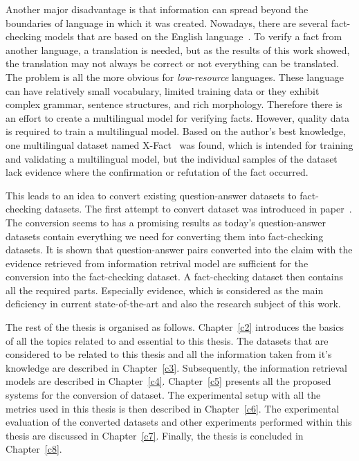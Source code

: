 Another major disadvantage is that information can spread beyond the boundaries of language in which it was created. Nowadays, there are several fact-checking models that are based on the English language~\cite{faviq}\cite{fever}\cite{covert}. To verify a fact from another language, a translation is needed, but as the results of this work showed, the translation may not always be correct or not everything can be translated. The problem is all the more obvious for \emph{low-resource} languages. These language can have relatively small vocabulary, limited training data or they exhibit complex grammar, sentence structures, and rich morphology. Therefore there is an effort to create a multilingual model for verifying facts. However, quality data is required to train a multilingual model. Based on the author's best knowledge, one multilingual dataset named X-Fact~\cite{x-fact} was found, which is intended for training and validating a multilingual model, but the individual samples of the dataset lack evidence where the confirmation or refutation of the fact occurred.

This leads to an idea to convert existing question-answer datasets to fact-checking datasets. The first attempt to convert dataset was introduced in paper~\cite{faviq}. The conversion seems to has a promising results as today's question-answer datasets contain everything we need for converting them into fact-checking datasets. It is shown that question-answer pairs converted into the claim with the evidence retrieved from information retrival model are sufficient for the conversion into the fact-checking dataset. A fact-checking dataset then contains all the required parts. Especially evidence, which is considered as the main deficiency in current state-of-the-art and also the research subject of this work.

The rest of the thesis is organised as follows. Chapter~\ref{c2} introduces the basics of all the topics related to and essential to this thesis. The datasets that are considered to be related to this thesis and all the information taken from it's knowledge are described in Chapter~\ref{c3}. Subsequently, the information retrieval models are described in Chapter~\ref{c4}. Chapter~\ref{c5} presents all the proposed systems for the conversion of dataset. The experimental setup with all the metrics used in this thesis is then described in Chapter~\ref{c6}. The experimental evaluation of the converted datasets and other experiments performed within this thesis are discussed in Chapter~\ref{c7}. Finally, the thesis is concluded in Chapter~\ref{c8}.

